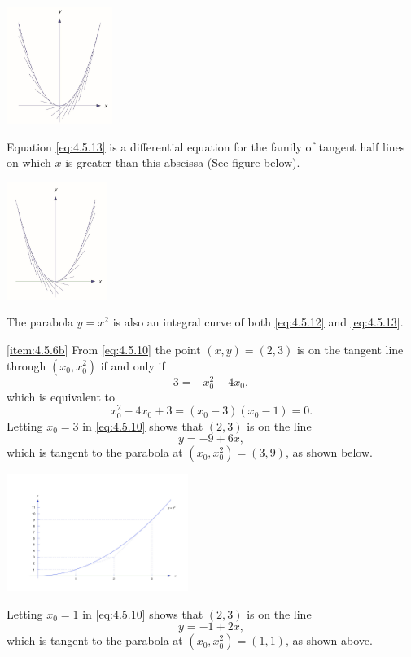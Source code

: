 \documentclass{ximera}
\begin{document}
\begin{example}
\begin{explanation}
\begin{image}
  \includegraphics[height=1.5in]{fig040504a.jpg} 
\end{image}

Equation \eqref{eq:4.5.13} is a
differential
equation for the family of tangent half lines on which $x$ is greater
than this abscissa (See figure below). 

\begin{image}
  \includegraphics[height=1.5in]{fig040504b.jpg} 
\end{image}

The
parabola $y=x^2$ is also an integral curve of both \eqref{eq:4.5.12} and
\eqref{eq:4.5.13}.

\ref{item:4.5.6b}
From \eqref{eq:4.5.10} the point $(x,y)=(2,3)$ is on the tangent line
through $(x_0,x_0^2)$ if and only if
$$
3=-x_0^2+4x_0,
$$
which is equivalent to
$$
x_0^2-4x_0+3=(x_0-3)(x_0-1)=0.
$$
Letting $x_0=3$ in \eqref{eq:4.5.10} shows that $(2,3)$ is on the line
$$
y=-9+6x,
$$
which is tangent to the parabola at $(x_0,x_0^2)=(3,9)$, as shown below.

\begin{image}
  \includegraphics[height=1.5in]{fig040505.jpg} 
\end{image}


Letting $x_0=1$ in \eqref{eq:4.5.10} shows that $(2,3)$ is on the line
$$
y=-1+2x,
$$
which is tangent to the parabola at $(x_0,x_0^2)=(1,1)$, as shown above.
\end{explanation}
\end{example}
\end{document}
